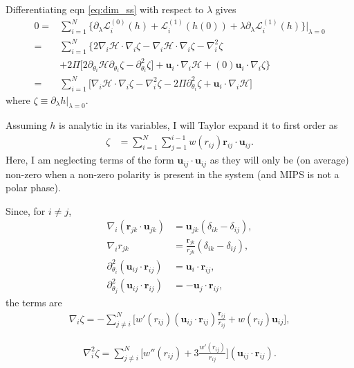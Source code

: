 \documentclass[twocolumn,amsmath,amssymb,aps]{revtex4-1}%
\begin{document}
Differentiating eqn \ref{eq:dim_ss} with respect to $\lambda$ gives
\begin{align}\label{eq:first_perturb_DE}
  0
  =&\sum_{i=1}^N\big\{\partial_{\lambda}\mathcal{L}_i^{(0)}(h)
    + \mathcal{L}_i^{(1)}(h(0))
    +\lambda\partial_{\lambda}\mathcal{L}_i^{(1)}
    (h)\big\}\bigg|_{\lambda=0}\nonumber\\
  =&\sum_{i=1}^N\big\{2\nabla_i \mathcal{H}\cdot\nabla_i\zeta
    - \nabla_i\mathcal{H}\cdot\nabla_i\zeta
    -\nabla_i^2\zeta\nonumber\\
    &+2\Pi\big[2\partial_{\theta_i}\mathcal{H}\partial_{\theta_i}\zeta
    -\partial_{\theta_i}^2\zeta\big]
    + \bm{u}_i\cdot\nabla_i\mathcal{H}
    +(0)\bm{u}_i\cdot\nabla_i\zeta\big\}\nonumber\\
  =&\sum_{i=1}^N\big[\nabla_i \mathcal{H}\cdot\nabla_i\zeta
    -\nabla_i^2\zeta - 2\Pi
    \partial_{\theta_i}^2\zeta
    + \bm{u}_i\cdot\nabla_i\mathcal{H}\big]
\end{align}
where $\zeta\equiv\partial_{\lambda}h|_{\lambda=0}$.

Assuming $h$ is analytic in its variables, I will Taylor expand it to
first order as
\begin{align}\label{eq:zetaform}
  \zeta &= \sum_{i=1}^N\sum_{j=1}^{i-1}
      w(r_{ij})\bm{r}_{ij}\cdot\bm{u}_{ij}.
\end{align}
Here, I am neglecting terms of the form $\bm{u}_{ij}\cdot\bm{u}_{ij}$ as
they will only be (on average) non-zero when a non-zero polarity is present
in the system (and MIPS is not a polar phase).


Since, for $i\neq j$,
\begin{align}
  \nabla_i(\bm{r}_{jk}\cdot\bm{u}_{jk})
  &= \bm{u}_{jk}(\delta_{ik}-\delta_{ij}),\\
  \nabla_i r_{jk}
  &=\frac{\bm{r}_{jk}}{r_{jk}}(\delta_{ik}-\delta_{ij}),\\
  \partial_{\theta_i}^2(\bm{u}_{ij}\cdot\bm{r}_{ij})
  &=\bm{u}_i\cdot\bm{r}_{ij},\\
  \partial_{\theta_j}^2(\bm{u}_{ij}\cdot\bm{r}_{ij})
  &=-\bm{u}_j\cdot\bm{r}_{ij},
\end{align}
the terms are
\begin{align}
  \nabla_{i}\zeta = -\sum_{j\neq i}^N \bigg[w'(r_{ij})
  (\bm{u}_{ij}\cdot\bm{r}_{ij})\frac{\bm{r}_{ij}}{r_{ij}}
  +w(r_{ij})\bm{u}_{ij}\bigg],
\end{align}

\begin{align}
  \nabla_i^2\zeta=\sum_{j\neq i}^N\bigg[w''(r_{ij})
  +3\frac{w'(r_{ij})}{r_{ij}}\bigg](\bm{u}_{ij}\cdot\bm{r}_{ij}).
\end{align}
\end{document}

